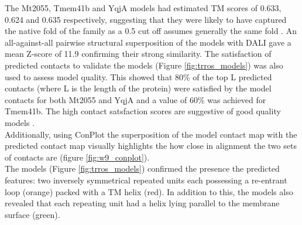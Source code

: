 The Mt2055, Tmem41b and YqjA models had estimated TM scores of 0.633, 0.624 and 0.635 respectively, suggesting that they were likely to have captured the native fold of the family as a 0.5 cut off assumes generally the same fold \cite{zhang2005tm}. An all-against-all pairwise structural superposition of the models with DALI gave a mean Z-score of 11.9 confirming their strong similarity. The satisfaction of predicted contacts to validate the models (Figure \ref{fig:trros_models}) \cite{Simkovic2017} was also used to assess model quality. This showed that 80\% of the top L predicted contacts (where L is the length of the protein) were satisfied by the model contacts for both Mt2055 and YqjA and a value of 60\% was achieved for Tmem41b.  The high contact satsfaction scores are suggestive of good quality models \cite{DeOliveira2016}.  \\

Additionally, using ConPlot the superposition of the model contact map with the predicted contact map visually highlights the how close in alignment the two sets of contacts are (figure \ref{fig:w9_conplot}).\\

The models (Figure \ref{fig:trros_models}) confirmed the presence the predicted features: two inversely symmetrical repeated units each possessing a re-entrant loop (orange) packed with a TM helix (red).  In addition to this, the models also revealed that each repeating unit had a helix lying parallel to the membrane surface (green).\\

